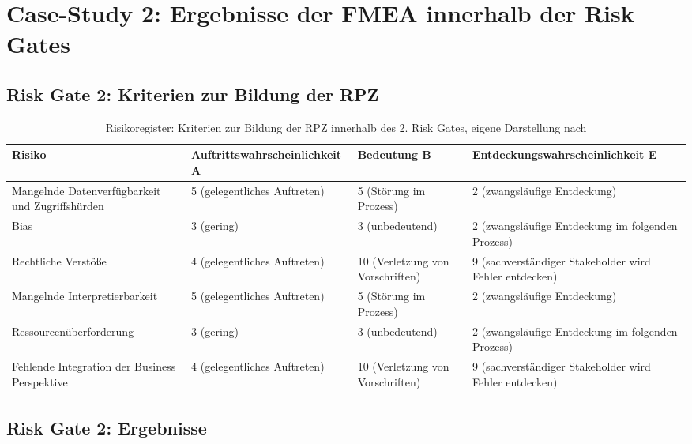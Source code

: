 \section{Case-Study 2: Ergebnisse der FMEA innerhalb der Risk Gates}

\subsection{Risk Gate 2: Kriterien zur Bildung der RPZ}
\begin{table}[H]
\centering
\renewcommand{\arraystretch}{1.3}
\begin{tabular}{|p{3cm}|p{4.9cm}|p{3cm}|p{4.9cm}|}
\hline
\textbf{Risiko} & \textbf{Auftritts\-wahrscheinlichkeit A} & \textbf{Bedeutung B} & \textbf{Entdeckungs\-wahrscheinlichkeit E} \\
\hline

Mangelnde Datenverfügbarkeit und Zugriffshürden 
& 5 (gelegentliches Auftreten)
& 5 (Störung im Prozess)
& 2 (zwangsläufige Entdeckung) \\
\hline

Bias 
& 3 (gering)
& 3 (unbedeutend)
& 2 (zwangsläufige Entdeckung im folgenden Prozess) \\
\hline

Rechtliche Verstöße
& 4 (gelegentliches Auftreten)
& 10 (Verletzung von Vorschriften)
& 9 (sachverständiger Stakeholder wird Fehler entdecken) \\
\hline

Mangelnde Interpretierbarkeit
& 5 (gelegentliches Auftreten)
& 5 (Störung im Prozess)
& 2 (zwangsläufige Entdeckung) \\
\hline

Res\-sour\-cen\-über\-for\-de\-rung
& 3 (gering)
& 3 (unbedeutend)
& 2 (zwangsläufige Entdeckung im folgenden Prozess) \\
\hline

Fehlende Integration der Business Perspektive
& 4 (gelegentliches Auftreten)
& 10 (Verletzung von Vorschriften)
& 9 (sachverständiger Stakeholder wird Fehler entdecken) \\
\hline

\end{tabular}
\caption{Risikoregister: Kriterien zur Bildung der RPZ innerhalb des 2. Risk Gates, eigene Darstellung nach \cite{Bundesministerium_2018}}
\label{tab:cs2_app_rg2_kriterien_rpz}
\end{table}

\subsection{Risk Gate 2: Ergebnisse}


